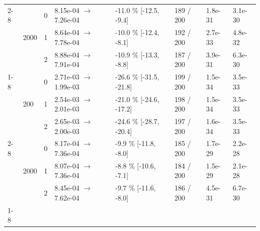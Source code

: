 \begin{tabular}{llllllll}
\cline{2-8}
 & \multirow[t]{3}{*}{2000} & 0 & 8.15e-04 $\rightarrow$ 7.26e-04 & -11.0 \% [-12.5, -9.4] & 189 / 200 & 1.8e-31 & 3.1e-30 \\
 &  & 1 & 8.64e-04 $\rightarrow$ 7.78e-04 & -10.0 \% [-12.4, -8.1] & 192 / 200 & 2.7e-33 & 4.8e-32 \\
 &  & 2 & 8.88e-04 $\rightarrow$ 7.91e-04 & -10.9 \% [-13.3, -8.8] & 187 / 200 & 3.9e-31 & 6.3e-30 \\
\cline{1-8} \cline{2-8}
\multirow[t]{6}{*}{P4 after UNet2dHLCC} & \multirow[t]{3}{*}{200} & 0 & 2.71e-03 $\rightarrow$ 1.99e-03 & -26.6 \% [-31.5, -21.8] & 199 / 200 & 1.5e-34 & 3.5e-33 \\
 &  & 1 & 2.54e-03 $\rightarrow$ 2.01e-03 & -21.0 \% [-24.6, -17.2] & 198 / 200 & 1.5e-34 & 3.5e-33 \\
 &  & 2 & 2.65e-03 $\rightarrow$ 2.00e-03 & -24.6 \% [-28.7, -20.4] & 197 / 200 & 1.6e-34 & 3.5e-33 \\
\cline{2-8}
 & \multirow[t]{3}{*}{2000} & 0 & 8.17e-04 $\rightarrow$ 7.36e-04 & -9.9 \% [-11.8, -8.0] & 185 / 200 & 1.7e-29 & 2.2e-28 \\
 &  & 1 & 8.07e-04 $\rightarrow$ 7.36e-04 & -8.8 \% [-10.6, -7.1] & 184 / 200 & 1.5e-29 & 2.1e-28 \\
 &  & 2 & 8.45e-04 $\rightarrow$ 7.62e-04 & -9.7 \% [-11.6, -8.0] & 186 / 200 & 4.5e-31 & 6.7e-30 \\
\cline{1-8} \cline{2-8}
\bottomrule
\end{tabular}
